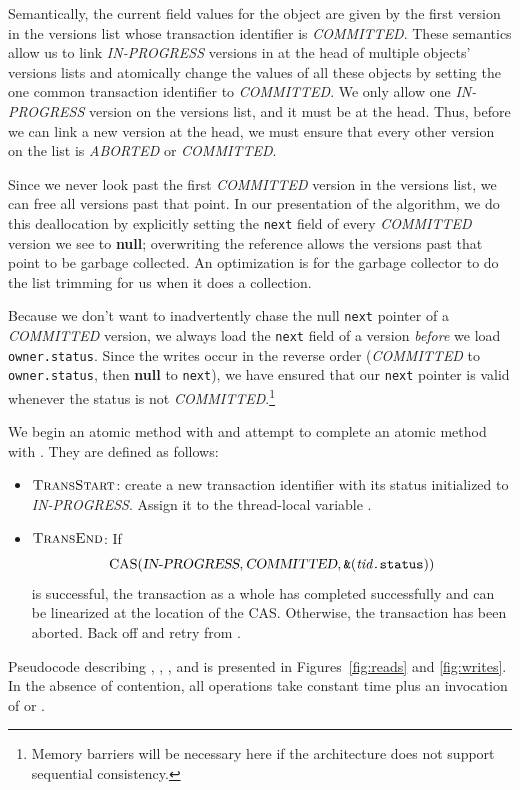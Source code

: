 Semantically, the current field values for the object are given by
the first version in 
the versions list whose transaction identifier is {\sl COMMITTED}\@.
These semantics allow us to link {\sl IN-PROGRESS} versions in at the head of
multiple objects' versions lists and atomically change the values of
all these objects by setting the one common transaction identifier to
{\sl COMMITTED}\@.  We only allow one {\sl IN-PROGRESS} version on the
versions list, and it must be at the head. Thus,
before we can link a new version at the head, we
must ensure that every other version on the list is {\sl ABORTED} or
{\sl COMMITTED}\@.

Since we never look past the first {\sl COMMITTED} version in the
versions list, we can free all versions past that point.  In our
presentation of the algorithm, we do this deallocation by explicitly setting the
{\tt next} field of every {\sl COMMITTED} version we see to {\bf null};
overwriting the reference allows the versions past that point to be garbage collected.
An optimization is for the garbage collector to do the list
trimming for us when it does a collection.


Because we don't want to inadvertently chase the null {\tt next} pointer
of a {\sl COMMITTED} version, we always load the {\tt next}
field of a version \emph{before} we load {\tt owner.status}.  Since
the writes occur in the reverse order ({\sl COMMITTED} to
{\tt owner.status}, then {\bf null} to {\tt next}), we have ensured that
our {\tt next} pointer is valid whenever the status is not
{\sl COMMITTED}\@.\footnote{Memory barriers will be necessary here if
the architecture does not support sequential consistency.}

We begin an atomic method with  and attempt to
complete an atomic method with .  They are defined as
follows:
\begin{itemize}
\item $\text{\sc TransStart}$: create a new transaction identifier with
  its status initialized to {\sl IN-PROGRESS}\@.  Assign it to the
  thread-local variable .
\item $\text{\sc TransEnd}$:
  If
 $$\text{CAS}(\text{\sl IN-PROGRESS}, \text{\sl COMMITTED},
             \text{\tt \&}(\text{\it tid}\text{\tt .status}))$$
  is successful, the transaction as a whole has completed successfully
  and can be linearized at the location of the CAS\@.
  Otherwise, the transaction has been aborted.  Back off and retry from
  .
\end{itemize}
Pseudocode describing , , ,
and  is presented in Figures~\ref{fig:reads} and
\ref{fig:writes}.  In the absence of contention, all operations take
constant time plus an invocation of  or
.

